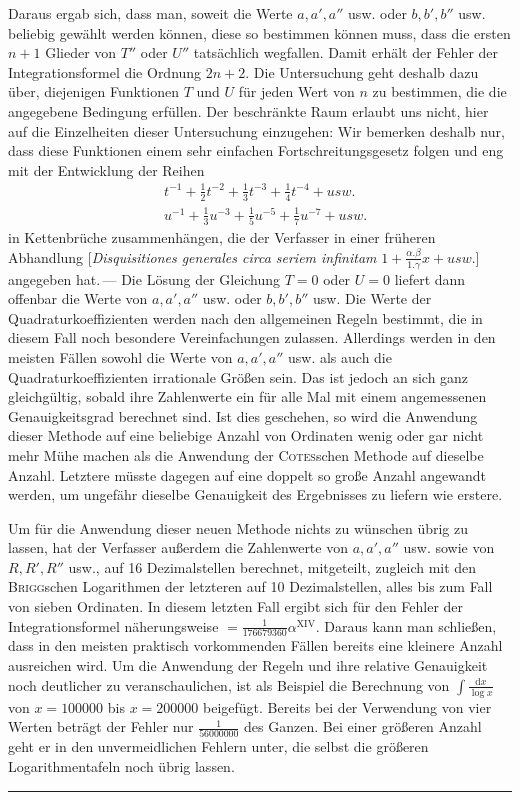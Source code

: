 Daraus ergab sich, dass man, soweit die Werte \(a,a',a''\) usw. oder \(b,b',b''\) usw. beliebig gewählt werden können, diese so bestimmen können muss, dass die ersten \(n+1\) Glieder von \(T''\) oder \(U''\) tatsächlich wegfallen. Damit erhält der Fehler der Integrationsformel die Ordnung \(2n+2\). Die Untersuchung geht deshalb dazu über, diejenigen Funktionen \(T\) und \(U\) für jeden Wert von \(n\) zu bestimmen, die die angegebene Bedingung erfüllen. Der beschränkte Raum erlaubt
uns nicht, hier auf die Einzelheiten dieser Untersuchung einzugehen: Wir bemerken deshalb nur, dass diese Funktionen einem sehr einfachen Fortschreitungsgesetz folgen und eng mit der Entwicklung der Reihen
\[
\begin{aligned}
&t^{-1}+\tfrac{1}{2}t^{-2}+\tfrac{1}{3}t^{-3}+\tfrac{1}{4}t^{-4}+\mathit{usw.}\\
&u^{-1}+\tfrac{1}{3}u^{-3}+\tfrac{1}{5}u^{-5}+\tfrac{1}{7}u^{-7}+\mathit{usw.}
\end{aligned}
\]
in Kettenbrüche zusammenhängen, die der Verfasser in einer früheren Abhandlung [\textit{Disquisitiones generales circa seriem infinitam}
\(1+\frac{\alpha.\beta}{1.\gamma}x+\mathit{usw.}\)] angegeben hat.\,---
Die Lösung der Gleichung \(T=0\) oder \(U=0\) liefert dann offenbar die Werte von \(a,a',a''\) usw. oder \(b,b',b''\) usw. Die Werte der Quadraturkoeffizienten werden nach den allgemeinen Regeln bestimmt, die in diesem Fall noch besondere Vereinfachungen zulassen. Allerdings werden in den meisten Fällen sowohl die Werte von \(a,a',a''\) usw. als auch die Quadraturkoeffizienten irrationale Größen sein. Das ist jedoch an sich ganz gleichgültig, sobald ihre Zahlenwerte ein für alle Mal mit einem angemessenen Genauigkeitsgrad berechnet sind. Ist dies geschehen, so wird die Anwendung dieser Methode auf eine beliebige Anzahl von Ordinaten wenig oder gar nicht mehr Mühe machen als die Anwendung der \textsc{Cotes}schen Methode auf dieselbe Anzahl. Letztere müsste dagegen auf eine doppelt so große Anzahl angewandt werden, um ungefähr dieselbe Genauigkeit des Ergebnisses zu liefern wie erstere.

Um für die Anwendung dieser neuen Methode nichts zu wünschen übrig zu lassen, hat der Verfasser außerdem die Zahlenwerte von \(a,a',a''\) usw. sowie von \(R,R',R''\) usw., auf 16 Dezimalstellen berechnet, mitgeteilt, zugleich mit den \textsc{Brigg}schen Logarithmen der letzteren auf 10 Dezimalstellen, alles bis zum Fall von sieben Ordinaten. In diesem letzten Fall ergibt sich für den Fehler der Integrationsformel näherungsweise \(=\frac{1}{176679360}\alpha^{\mathrm{XIV}}\). Daraus kann man schließen, dass in den meisten praktisch vorkommenden Fällen bereits eine kleinere Anzahl ausreichen wird. Um die Anwendung der Regeln und ihre relative Genauigkeit noch deutlicher zu veranschaulichen, ist als Beispiel die Berechnung von \(\int\frac{\mathrm{d}x}{\log x}\) von \(x=100000\) bis \(x=200000\) beigefügt. Bereits bei der Verwendung von vier Werten beträgt der Fehler nur \(\frac{1}{56000000}\) des Ganzen. Bei einer größeren Anzahl geht er in den unvermeidlichen Fehlern unter, die selbst die größeren Logarithmentafeln noch übrig lassen.
\par\begin{center}\rule{0.22\linewidth}{0.3pt}\end{center}
